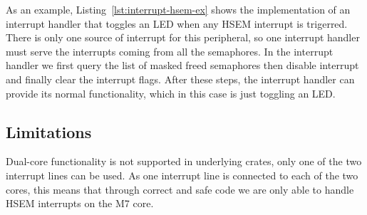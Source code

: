As an example, Listing~\ref{lst:interrupt-hsem-ex} shows the implementation of an interrupt handler that toggles an LED when any HSEM interrupt is trigerred. There is only one source of interrupt for this peripheral, so one interrupt handler must serve the interrupts coming from all the semaphores. In the interrupt handler we first query the list of masked freed semaphores then disable interrupt and finally clear the interrupt flags. After these steps, the interrupt handler can provide its normal functionality, which in this case is just toggling an LED.

\subsection{Limitations}

Dual-core functionality is not supported in underlying crates, only one of the two interrupt lines can be used. As one interrupt line is connected to each of the two cores, this means that through correct and safe code we are only able to handle HSEM interrupts on the M7 core.
